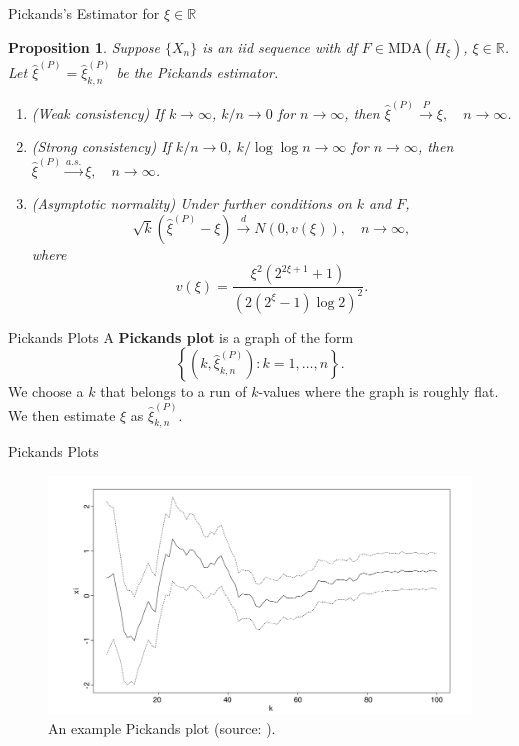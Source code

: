 \documentclass{beamer}
\newcommand{\MDA}{\text{MDA}}
\newtheorem{proposition}{Proposition}
\begin{document}
\begin{frame}{Pickands's Estimator for $\xi \in \mathbb{R}$}
    \begin{proposition}
        Suppose $\{X_n\}$ is an iid sequence with df $F \in \MDA(H_{\xi})$, $\xi \in \mathbb{R}$. Let $\hat{\xi}^{(P)} = \hat{\xi}_{k, n}^{(P)}$ be the Pickands estimator.
        \begin{enumerate}
            \item[(a)] (Weak consistency) If $k \to \infty$, $k / n \to 0$ for $n \to \infty$, then $\hat{\xi}^{(P)} \xrightarrow{P} \xi, \quad n \to \infty$.
            \item[(b)] (Strong consistency) If $k / n \to 0$, $k / \log\log n \to \infty$ for $n \to \infty$, then 
            $\hat{\xi}^{(P)} \xrightarrow{a.s.} \xi, \quad n \to \infty$.
            \item[(c)] (Asymptotic normality) Under further conditions on $k$ and $F$,
            \[
            \sqrt{k}(\hat{\xi}^{(P)} - \xi) \xrightarrow{d} N(0, v(\xi)), \quad n \to \infty,
            \]
            where
            \[
            v(\xi) = \frac{\xi^2(2^{2\xi + 1} + 1)}{(2(2^{\xi} - 1)\log 2)^2}.
            \]
        \end{enumerate}
    \end{proposition}    
\end{frame}

\begin{frame}{Pickands Plots}
    A \textbf{Pickands plot} is a graph of the form
    \[
    \left\{\left(k, \hat{\xi}_{k, n}^{(P)}\right) : k = 1, \ldots, n\right\}.
    \]
    We choose a $k$ that belongs to a run of $k$-values where the graph is roughly flat. We then estimate $\xi$ as $\hat{\xi}_{k, n}^{(P)}$.
\end{frame}

\begin{frame}{Pickands Plots}
    \begin{figure}
        \centering
        \includegraphics[scale=0.35]{pickands_plot.png}
        \caption{An example Pickands plot (source: \cite{embrechts_et_al_1997}).}
        \label{fig:pickands_plot}
    \end{figure}
\end{frame}
\end{document}
